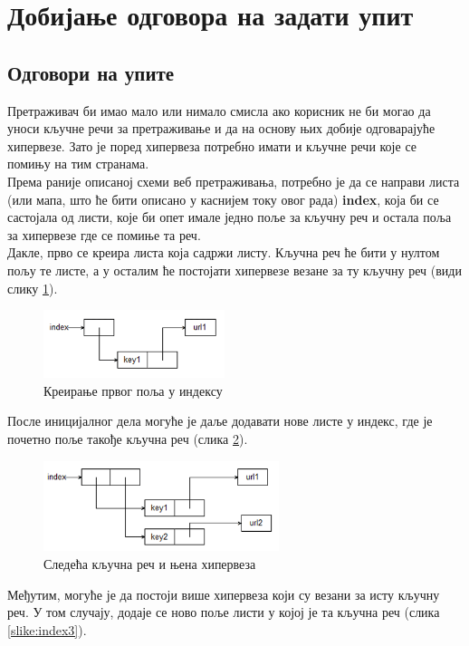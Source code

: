 \section{Добијање одговора на задати упит}	
	\subsection{Одговори на упите}
	Претраживач би имао мало или нимало смисла ако корисник не би могао да уноси кључне речи за претраживање и да на основу њих добије одговарајуће хипервезе. Зато је поред хипервеза потребно имати и кључне речи које се помињу на тим странама. \\
	Према раније описаној схеми веб претраживања, потребно је да се направи листа (или мапа, што ће бити описано у каснијем току овог рада) \textbf{index}, која би се састојала од листи, које би опет имале једно поље за кључну реч и остала поља за хипервезе где се помиње та реч. \\
	 Дакле, прво се креира листа која садржи листу. Кључна реч ће бити у нултом пољу те листе, а у осталим ће постојати хипервезе везане за ту кључну реч (види слику \ref{slike:indeks1}).\\
        \begin{figure}[here]
		\centering
		
		\includegraphics[height=75px, width=200px]{index1.png}
		\caption{Креирање првог поља у индексу}
		\label{slike:indeks1}
		\end{figure}
После иницијалног дела могуће је даље додавати нове листе у индекс, где је почетно поље такође кључна реч (слика \ref{slike:index2}).\\
		\begin{figure}[here]
		\centering
		
		\includegraphics[height=100px, width=260px]{index2.png}
		\caption{Следећа кључна реч и њена хипервеза}
		\label{slike:index2}
		\end{figure}
		Међутим, могуће је да постоји више хипервеза који су везани за исту кључну реч. У том случају, додаје се ново поље листи у којој је та кључна реч (слика \ref{slike:index3}).\\
		\\
		
